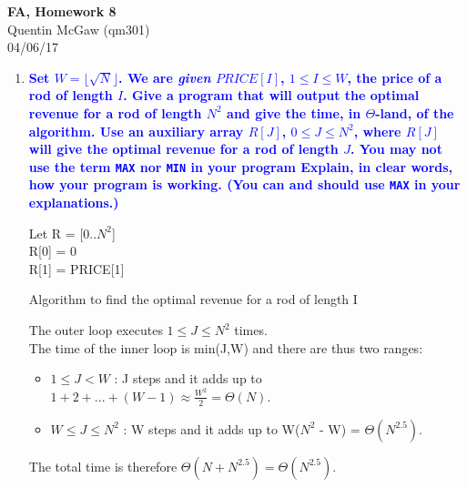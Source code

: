 \documentclass[11pt]{article}
\begin{document}
\begin{center} {\Large\bf FA, Homework 8} \\ Quentin McGaw (qm301) \\ 04/06/17
\end{center}

\begin{enumerate}
\item \textbf{\textcolor{blue}{Set $W=\lfloor{\sqrt{N}}\rfloor$. We are {\em given} $PRICE[I]$, $1\leq I\leq W$, the price of a rod of length $I$. Give a program that will output the optimal revenue for a rod of length $N^2$ and give the time, in $\Theta$-land, of the algorithm. Use an auxiliary array $R[J]$, $0\leq J\leq N^2$, where $R[J]$ will give the optimal revenue for a rod of length $J$. You may {\bf not} use the term {\tt MAX} nor {\tt MIN} in your program  Explain, in clear words, how your program is working. (You can and should use {\tt MAX} in your explanations.)}}
    \begin{algorithm}[H]
        Let R = [0..$N^2$] \\
        R[0] = 0 \\
        R[1] = PRICE[1] \\
        \caption{Algorithm to find the optimal revenue for a rod of length I}
    \end{algorithm}
    The outer loop executes $1 \leq J \leq N^2$ times.
    \\ The time of the inner loop is min(J,W) and there are thus two ranges:
    \begin{itemize}
        \item $1 \leq J < W$ : J steps and it adds up to $1 + 2 + ... + (W - 1) \approx \frac{W^2}{2} = \Theta(N)$.
        \item $W \leq J \leq N^2$ : W steps and it adds up to W($N^2$ - W) = $\Theta(N^{2.5})$.
    \end{itemize}
    The total time is therefore $\Theta(N + N^{2.5}) = \Theta(N^{2.5})$.
    

\end{enumerate}
\end{document}
